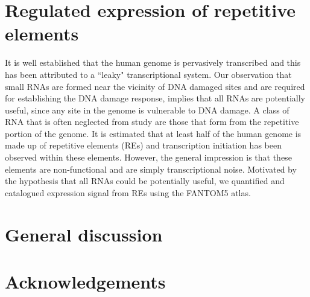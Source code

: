 \documentclass[10pt,a4paper]{report}
\begin{document}


%
%

%
%

\chapter{Regulated expression of repetitive elements}\label{repeat}


It is well established that the human genome is pervasively transcribed and this has been attributed to a ``leaky" transcriptional system. Our observation that small RNAs are formed near the vicinity of DNA damaged sites and are required for establishing the DNA damage response, implies that all RNAs are potentially useful, since any site in the genome is vulnerable to DNA damage. A class of RNA that is often neglected from study are those that form from the repetitive portion of the genome. It is estimated that at least half of the human genome is made up of repetitive elements (REs) and transcription initiation has been observed within these elements\cite{pmid19377475}. However, the general impression is that these elements are non-functional and are simply transcriptional noise. Motivated by the hypothesis that all RNAs could be potentially useful, we quantified and catalogued expression signal from REs using the FANTOM5 atlas.



%

\chapter{General discussion}\label{discussion}


\chapter*{Acknowledgements}



%

\end{document}

